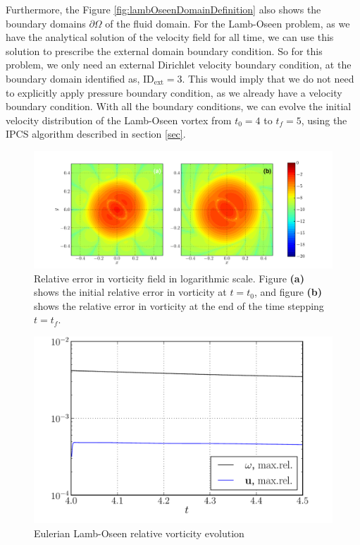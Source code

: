 Furthermore, the Figure \ref{fig:lambOseenDomainDefinition} also shows the boundary domains $\partial \Omega$ of the fluid domain. For the Lamb-Oseen problem, as we have the analytical solution of the velocity field for all time, we can use this solution to prescribe the external domain boundary condition. So for this problem, we only need an external Dirichlet velocity boundary condition, at the boundary domain identified as, $\mathrm{ID}_{\mathrm{ext}} = 3$. This would imply that we do not need to explicitly apply pressure boundary condition, as we already have a velocity boundary condition. With all the boundary conditions, we can evolve the initial velocity distribution of the Lamb-Oseen vortex from $t_0 = 4$ to $t_f =5$, using the IPCS algorithm described in section \ref{sec}. 

	\begin{figure}[p]
	\centering
	\includegraphics[width=0.99\linewidth]{./figures/eulerian/lambOseen_eulerian_wRelField_compressed.pdf}
	\caption{Relative error in vorticity field in logarithmic scale. Figure \textbf{(a)} shows the initial relative error in vorticity at $t=t_0$, and figure \textbf{(b)} shows the relative error in vorticity at the end of the time stepping $t=t_f$.}
	\label{fig:lambOseen_eulerian_wRelField_compressed}
	\end{figure}
	
	\begin{figure}[p]
	\centering
	\includegraphics[width=0.6\linewidth]{./figures/eulerian/lambOseen_eulerian_wRelEvolution_compressed.pdf}
	\caption{Eulerian Lamb-Oseen relative vorticity evolution}
	\label{fig:lambOseen_eulerian_wRelEvolution}
	\end{figure}

